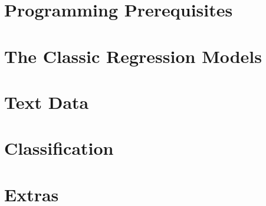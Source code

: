 \documentclass[11pt,openany]{book}
\theoremstyle{theorem}
\theoremstyle{plain}
\theoremstyle{definition}
\theoremstyle{remark}
\begin{document}

\frontmatter
\tableofcontents



\mainmatter
\part{Programming Prerequisites}



%

\part{The Classic Regression Models}




\part{Text Data}


\part{Classification}


\part{Extras}




\backmatter



\printindex %
\end{document}

